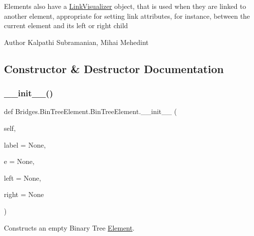 Elements also have a \mbox{\hyperlink{namespace_bridges_1_1_link_visualizer}{Link\+Visualizer}} object, that is used when they are linked to another element, appropriate for setting link attributes, for instance, between the current element and its left or right child

\begin{DoxyAuthor}{Author}
Kalpathi Subramanian, Mihai Mehedint 
\end{DoxyAuthor}


\subsection{Constructor \& Destructor Documentation}
\mbox{\label{class_bridges_1_1_bin_tree_element_1_1_bin_tree_element_a84d42e67dfa4b7fbae53ae797a10c13e}} 
\subsubsection{\texorpdfstring{\+\_\+\+\_\+init\+\_\+\+\_\+()}{\_\_init\_\_()}}
{\footnotesize\ttfamily def Bridges.\+Bin\+Tree\+Element.\+Bin\+Tree\+Element.\+\_\+\+\_\+init\+\_\+\+\_\+ (\begin{DoxyParamCaption}\item[{}]{self,  }\item[{}]{label = {\ttfamily None},  }\item[{}]{e = {\ttfamily None},  }\item[{}]{left = {\ttfamily None},  }\item[{}]{right = {\ttfamily None} }\end{DoxyParamCaption})}



Constructs an empty Binary Tree \mbox{\hyperlink{namespace_bridges_1_1_element}{Element}}. 


